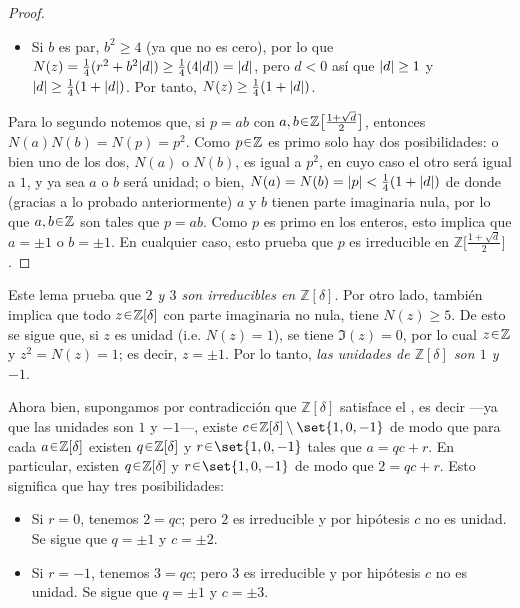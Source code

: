 \begin{sol}
\begin{enumerate}[label={\bfseries\Roman*}., wide, itemsep=1em]
\begin{proof}
\begin{itemize}
    \item Si $b$ es par, $b^2 \geq 4$ (ya que no es cero), por lo que $N(z) = \frac{1}{4}(r^2 + b^2\abs{d}) \geq \frac14(4\abs{d}) = \abs{d}$, pero $d < 0$ así que $\abs{d} \geq 1$ y $\abs{d} \geq \frac{1}{4}(1+\abs{d})$. Por tanto, $N(z) \geq \frac{1}{4}(1+\abs{d})$.
\end{itemize}
Para lo segundo notemos que, si $p = ab$ con $a,b\en\mathbb{Z}\big[\frac{1+\sqrt{d}}{2}\big]$, entonces $N(a)N(b) = N(p) = p^2$. Como $p\en\mathbb{Z}$ es primo solo hay dos posibilidades: o bien uno de los dos, $N(a)$ o $N(b)$, es igual a $p^2$, en cuyo caso el otro será igual a $1$, y ya sea $a$ o $b$ será unidad; o bien, $N(a) = N(b) = \abs{p} < \frac14(1+\abs{d})$ de donde (gracias a lo probado anteriormente) $a$ y $b$ tienen parte imaginaria nula, por lo que $a,b\en\mathbb{Z}$ son tales que $p = ab$. Como $p$ es primo en los enteros, esto implica que $a = \pm 1$ o $b = \pm1$. En cualquier caso, esto prueba que $p$ es irreducible en $\mathbb{Z}\big[\frac{1+\sqrt{d}}{2}\big]$.
\end{proof}

Este lema prueba que \emph{$2$ y $3$ son irreducibles en $\mathbb{Z}[\delta]$}. Por otro lado, también implica que todo $z \en \mathbb{Z}[\delta]$ con parte imaginaria no nula, tiene $N(z) \geq 5$. De esto se sigue que, si $z$ es unidad (i.e. $N(z) = 1$), se tiene $\Im(z) = 0$, por lo cual $z \en \mathbb{Z}$ y $z^2 = N(z) =1$; es decir, $z = \pm1$. Por lo tanto, \emph{las unidades de $\mathbb{Z}[\delta]$ son $1$ y $-1$}.

Ahora bien, supongamos por contradicción que $\mathbb{Z}[\delta]$ satisface el , es decir ---ya que las unidades son $1$ y $-1$---, existe $c\en\mathbb{Z}[\delta]\setminus\set{1,0,-1}$ de modo que para cada $a\en\mathbb{Z}[\delta]$ existen $q\en\mathbb{Z}[\delta]$ y $r\en\set{1,0,-1}$ tales que $a = qc + r$. En particular, existen $q\en\mathbb{Z}[\delta]$ y $r\en\set{1,0,-1}$ de modo que $2 = qc + r$. Esto significa que hay tres posibilidades:
\begin{itemize}
    \item Si $r=0$, tenemos $2 = qc$; pero $2$ es irreducible y por hipótesis $c$ no es unidad. Se sigue que $q = \pm 1$ y $c = \pm2$.

    \item Si $r = -1$, tenemos $3 = qc$; pero $3$ es irreducible y por hipótesis $c$ no es unidad. Se sigue que $q = \pm 1$ y $c = \pm3$.
    

\end{itemize}
\end{enumerate}
\end{sol}
